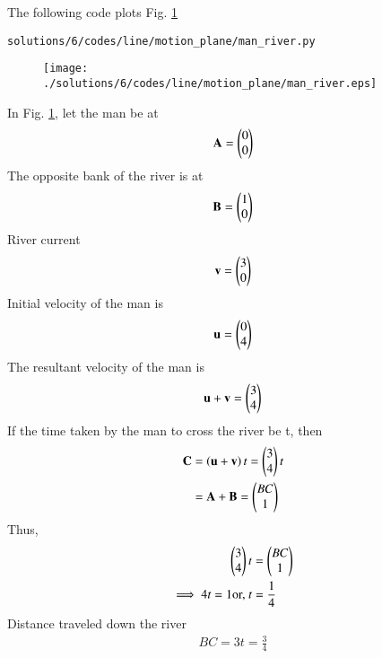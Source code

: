 %
The following code plots Fig. \ref{fig:3.8.6_triangle1}
\begin{lstlisting}
solutions/6/codes/line/motion_plane/man_river.py
\end{lstlisting}  
\begin{figure}[!ht]
\centering
\texttt{[image: ./solutions/6/codes/line/motion\_plane/man\_river.eps]}
\caption{}
\label{fig:3.8.6_triangle1}
\end{figure}
In Fig. \ref{fig:3.8.6_triangle1}, let the man be at
\begin{align}
\mathbf{A} = \begin{pmatrix}0\\0\end{pmatrix}
\end{align}
The opposite bank of the river is at 
\begin{align}
\mathbf{B} = \begin{pmatrix}1\\0\end{pmatrix}
\end{align}
River current
\begin{align}
\mathbf{v} = \begin{pmatrix}3\\0\end{pmatrix}
\end{align}
Initial velocity of the man  is
\begin{align}
\mathbf{u} = \begin{pmatrix}0\\4\end{pmatrix}
\end{align}
%
The resultant velocity of the man is 
\begin{align}
\mathbf{u}+\mathbf{v} = \begin{pmatrix}3\\4\end{pmatrix}
\end{align}
If the time taken by the man to cross the river be t, then
\begin{align}
\mathbf{C} &= \left(\mathbf{u}+\mathbf{v}\right)t = \begin{pmatrix}3\\4\end{pmatrix}t
\\
&= \mathbf{A}+\mathbf{B}  = \begin{pmatrix}BC\\1\end{pmatrix}
\end{align}
%
Thus,
\begin{align}
\begin{pmatrix}3\\4\end{pmatrix}t &=  \begin{pmatrix}BC\\1\end{pmatrix}
\\
\implies 4t = 1 \text{or, } t &= \frac{1}{4}
\end{align}
Distance traveled down the river
%
\begin{align}
BC = 3t = \frac{3}{4}
\end{align}
%

